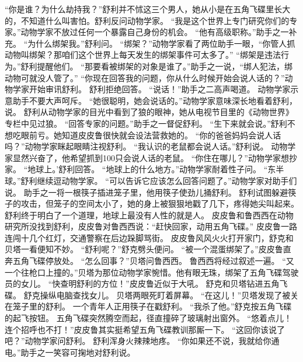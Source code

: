 \documentclass[a4paper,12pt,UTF8,twoside]{ctexbook}
\begin{document}
        “你是谁？为什么劫持我？”舒利并不怵这三个男人，她从小是在五角飞碟里长大的，不知道什么叫害怕。舒利反问动物学家。 
        “我是这个世界上专门研究你们的专家。”动物学家不放过任何一个暴露自己身份的机会。 
        “他有高级职称。”助手之一补充。 
        “为什么绑架我。”舒利问。 
        “绑架？”动物学家看了两位助手一眼，“你管人抓动物叫绑架？那咱们这个世界上每天发生的绑架事件可太多了。” 
        “绑架是违法行为。”舒利提醒他们。 
        “那要看被绑架的对象是谁了。”助手之一说，“绑人犯法，绑动物可就没人管了。” 
        “你现在回答我的问题，你从什么时候开始会说人话的？”动物学家开始审讯舒利。 
        舒利拒绝回答。 
        “说话！”助手之二高声喝道。 
        动物学家示意助手不要大声呵斥。 
        “她很聪明，她会说话的。”动物学家意味深长地看着舒利，说。 
        舒利从动物学家的目光中看到了狼的眼神，她从电视节目里的《动物世界》专栏中见过狼。 
        “回答专家的问题。”助手之一督促舒利。 
        “生下来就会说。”舒利不想吃眼前亏。她知道皮皮鲁很快就会设法营救她的。 
        “你的爸爸妈妈会说人话吗？”动物学家眯起眼睛注视舒利。 
        “我认识的老鼠都会说人话。”舒利说。 
        动物学家显然兴奋了，他希望抓到100只会说人话的老鼠。 
        “你住在哪儿？”动物学家想抄家。 
        “地球上。’舒利回答。 
        “地球上的什么地方。”动物学家耐着性子问。 
        “东半球。”舒利继续逗动物学家。 
        “可以告诉它应该怎么回答问题了。”动物学家对助手们说。 
        助手之一将一根筷子插进笼子里，他用筷子使劲儿捅舒利。 
        舒利试图躲避筷子的攻击，但笼子的空间太小了，她的身上被狠狠地戳了几下，疼得她尖叫起来。 
        舒利终于明白了一个道理，地球上最没有人性的就是人。 
        皮皮鲁和鲁西西在动物研究所没找到舒利，皮皮鲁对鲁西西说：“赶快回家，动用五角飞碟。” 
        皮皮鲁一路连闯十几个红灯，交通警察在后边跺脚骂街。 
        皮皮鲁风风火火打开家门，舒克和贝塔一看便知不妙。 
        “舒利呢？”舒克劈头便问。 
        “被一个混蛋绑架了。”皮皮鲁直奔五角飞碟停放处。 
        “怎么回事？”贝塔问鲁西西。 
        鲁西西将经过叙述一遍。 
        “又一个往枪口上撞的。”贝塔为那位动物学家惋惜。他有眼无珠，绑架了五角飞碟驾驶员的女儿。 
        “快查明舒利的方位！”皮皮鲁近似于大吼。 
        舒克和贝塔钻进五角飞碟。 
        舒克操纵电脑查找女儿。 
        贝塔两眼死盯着屏幕。 
        “在这儿！”贝塔发现了被关在笼子里的舒利。 
        一个青年人正用筷子在戳舒利。 
        “我杀了他。”舒克按五角飞碟的起飞按钮。 
        五角飞碟突然腾空而起，径直撞碎了玻璃射出窗外。 
        “悠着点儿！连个招呼也不打！”皮皮鲁其实挺希望五角飞碟教训那厮一下。 
        “这回你该说了吧？”动物学家问舒利。 
        舒利浑身火辣辣地疼。 
        “你如果还不说，我就给你通电。”助手之一笑容可掬地对舒利说。 
\end{document}
